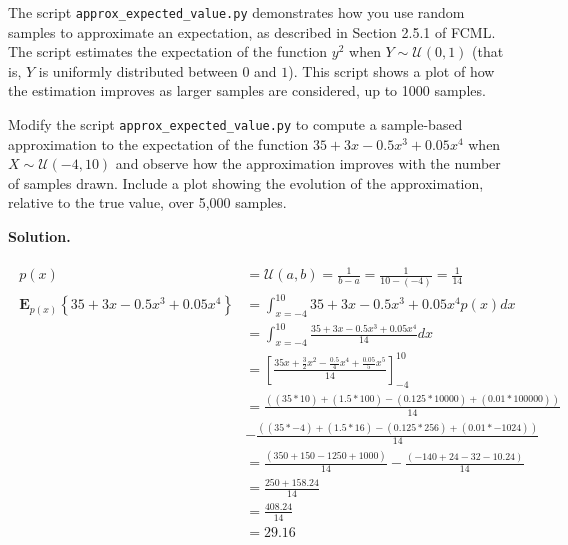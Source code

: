 \documentclass[10pt]{article}
\begin{document}
\begin{itemize}
The script {\tt approx\_expected\_value.py} demonstrates how you use random samples to approximate an expectation, as described in Section 2.5.1 of FCML.  The script estimates the expectation of the function $y^2$ when $Y \sim \mathcal{U}(0,1)$ (that is, $Y$ is uniformly distributed between $0$ and $1$).  This script shows a plot of how the estimation improves as larger samples are considered, up to 1000 samples.

Modify the script {\tt approx\_expected\_value.py} to compute a sample-based approximation to the expectation of the function $35 + 3x - 0.5x^3 + 0.05x^4$ when $X \sim \mathcal{U}(-4,10)$ and observe how the approximation improves with the number of samples drawn.  Include a plot showing the evolution of the approximation, relative to the true value, over 5,000 samples.

{\bf Solution.}

\begin{eqnarray*}
\begin{aligned}
p(x) &= \mathcal{U}(a,b) = \frac{1}{b-a} = \frac{1}{10 - (-4)} = \frac{1}{14}
\\
\mathbf{E}_{p(x)} \left\{ 35 + 3x - 0.5x^3 + 0.05x^4 \right\} 
&= \int_{x=-4}^{10} 35 + 3x - 0.5x^3 + 0.05x^4 p(x) dx
\\
&= \int_{x=-4}^{10} \frac{35 + 3x - 0.5x^3 + 0.05x^4}{14} dx
\\
&= \left[ \frac{35x + \frac{3}{2}x^2 - \frac{0.5}{4}x^4 + \frac{0.05}{5}x^5}{14} \right]_{-4}^{10}
\\
&= \frac{((35 * 10) + (1.5 * 100) - (0.125 * 10000) + (0.01 * 100000))}{14}
\\
& - \frac{((35 * -4) + (1.5 * 16)  - (0.125 * 256 ) + (0.01 * -1024) )}{14}
\\
&= \frac{(350 + 150 - 1250 + 1000)}{14} - \frac{(-140 + 24 - 32 - 10.24)}{14}
\\
&= \frac{250 + 158.24}{14}
\\
&= \frac{408.24}{14}
\\
&= 29.16
\end{aligned}
\end{eqnarray*}


\end{itemize}
\end{document}
